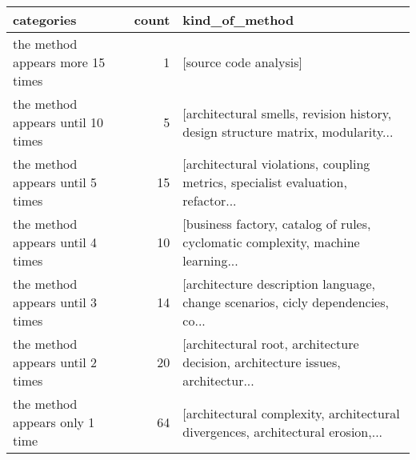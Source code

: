 \begin{tabular}{lrl}
\toprule
                        categories &  count &                                                                   kind\_of\_method \\
\midrule
  the method appears more 15 times &      1 &                                                           [source code analysis] \\
 the method appears until 10 times &      5 &  [architectural smells, revision history, design structure matrix, modularity... \\
  the method appears until 5 times &     15 &  [architectural violations, coupling metrics, specialist evaluation, refactor... \\
  the method appears until 4 times &     10 &  [business factory, catalog of rules, cyclomatic complexity, machine learning... \\
  the method appears until 3 times &     14 &  [architecture description language, change scenarios, cicly dependencies, co... \\
  the method appears until 2 times &     20 &  [architectural root, architecture decision, architecture issues, architectur... \\
    the method appears only 1 time &     64 &  [architectural complexity, architectural divergences, architectural erosion,... \\
\bottomrule
\end{tabular}
